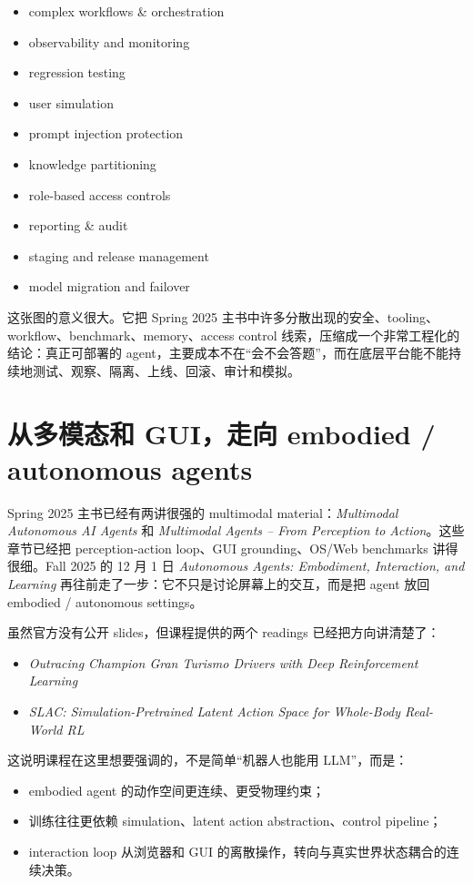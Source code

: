 \documentclass[11pt]{ctexbook}
\begin{document}
\begin{itemize}
\item complex workflows \& orchestration
\item observability and monitoring
\item regression testing
\item user simulation
\item prompt injection protection
\item knowledge partitioning
\item role-based access controls
\item reporting \& audit
\item staging and release management
\item model migration and failover
\end{itemize}

这张图的意义很大。它把 Spring 2025 主书中许多分散出现的安全、tooling、workflow、benchmark、memory、access control 线索，压缩成一个非常工程化的结论：真正可部署的 agent，主要成本不在“会不会答题”，而在底层平台能不能持续地测试、观察、隔离、上线、回滚、审计和模拟。

\section{从多模态和 GUI，走向 embodied / autonomous agents}

Spring 2025 主书已经有两讲很强的 multimodal material：\emph{Multimodal Autonomous AI Agents} 和 \emph{Multimodal Agents -- From Perception to Action}。这些章节已经把 perception-action loop、GUI grounding、OS/Web benchmarks 讲得很细。Fall 2025 的 12 月 1 日 \emph{Autonomous Agents: Embodiment, Interaction, and Learning} 再往前走了一步：它不只是讨论屏幕上的交互，而是把 agent 放回 embodied / autonomous settings。

虽然官方没有公开 slides，但课程提供的两个 readings 已经把方向讲清楚了：

\begin{itemize}
\item \emph{Outracing Champion Gran Turismo Drivers with Deep Reinforcement Learning}
\item \emph{SLAC: Simulation-Pretrained Latent Action Space for Whole-Body Real-World RL}
\end{itemize}

这说明课程在这里想要强调的，不是简单“机器人也能用 LLM”，而是：

\begin{itemize}
\item embodied agent 的动作空间更连续、更受物理约束；
\item 训练往往更依赖 simulation、latent action abstraction、control pipeline；
\item interaction loop 从浏览器和 GUI 的离散操作，转向与真实世界状态耦合的连续决策。
\end{itemize}
\end{document}
